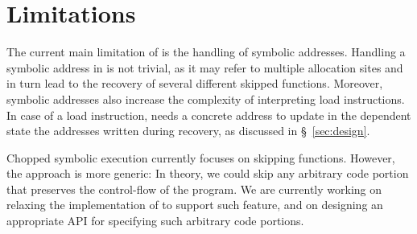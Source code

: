 \section{Limitations}
The current main limitation of \toolname is
the handling of symbolic addresses. Handling a symbolic address in
\toolname is not trivial, as it may refer to multiple allocation sites
and in turn lead to the recovery of several different skipped
functions. Moreover, symbolic addresses also increase the complexity
of interpreting load instructions. In case of a load instruction,
\toolname needs a concrete address to update in the dependent state
the addresses written during recovery, as discussed in
\S~\ref{sec:design}.

Chopped symbolic execution currently focuses on skipping functions.
However, the approach is more generic: In theory, we could skip any
arbitrary code portion that preserves the control-flow of the
program. We are currently working on relaxing the implementation of
\toolname to support such feature, and on designing an appropriate API
for specifying such arbitrary code portions.

